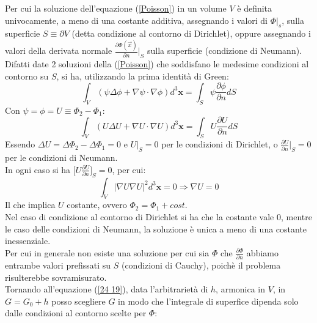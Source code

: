 \documentclass[twoside]{article}
\renewcommand{\vec}[1]{\textbf{#1}}
\begin{document}
Per cui la soluzione dell'equazione (\ref{Poisson}) in un volume $V$ è definita univocamente, a meno di una costante additiva, assegnando i valori di $\Phi|_s$, sulla superficie $S\equiv \partial V$ (detta condizione al contorno di Dirichlet), oppure assegnando i valori della derivata normale $\frac{\partial \Phi(\Vec{x})}{\partial n}\bigg|_S$ sulla superficie (condizione di Neumann).\\
Difatti date 2 soluzioni della (\ref{Poisson}) che soddisfano le medesime condizioni al contorno su $S$, si ha, utilizzando la prima identità di Green:
\begin{equation}
    \int_V(\psi\Delta\phi+\nabla\psi\cdot\nabla\phi)d^3\vec{x}=\int_S\psi\frac{\partial\phi}{\partial n}dS
\end{equation}
Con $\psi=\phi=U\equiv\Phi_2-\Phi_1$:
\begin{equation}
    \int_V(U\Delta U+\nabla U\cdot\nabla U) d^3\vec{x} = \int_S U\frac{\partial U}{\partial n}dS
\end{equation}
Essendo $\Delta U=\Delta \Phi_2-\Delta\Phi_1=0$ e $U|_S=0$ per le condizioni di Dirichlet, o $\frac{\partial U}{\partial n}|_S=0$ per le condizioni di Neumann.\\
In ogni caso si ha $\biggl[U\frac{\partial U}{\partial n}\biggr]_S=0$, per cui:
\begin{equation}
    \int_V|\nabla U\nabla U|^2 d^3\vec{x} = 0 \Longrightarrow \nabla U=0
\end{equation}
Il che implica $U$ costante, ovvero $\Phi_2=\Phi_1+cost$.\\
Nel caso di condizione al contorno di Dirichlet si ha che la costante vale 0, mentre le caso delle condizioni di Neumann, la soluzione è unica a meno di una costante inessenziale.\\
Per cui in generale non esiste una soluzione per cui sia $\Phi$ che $\frac{\partial \Phi}{\partial n}$ abbiamo entrambe valori prefissati su $S$ (condizioni di Cauchy), poichè il problema risulterebbe sovramisurato.\\
Tornando all'equazione (\ref{24 19}), data l'arbitrarietà di $h$, armonica in $V$, in $G=G_0+h$ posso scegliere $G$ in modo che l'integrale di superfice dipenda solo dalle condizioni al contorno scelte per $\Phi$:
\end{document}
